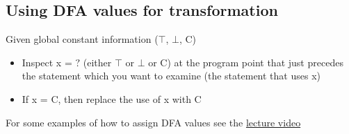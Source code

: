 \subsection{Using DFA values for transformation}

Given global constant information ($\top$, $\bot$, C)
\begin{itemize}
    \item Inspect x = $?$ (either $\top$ or $\bot$ or C) at the program point that just precedes the statement which you want to examine (the statement that uses x)
    \item If x = C, then replace the use of x with C
\end{itemize}

For some examples of how to assign DFA values see the 
\href{https://www.youtube.com/watch?v=EI56VONzCcc&list=PLf3ZkSCyj1tf3rPAkOKY5hUzDrDoekAc7&index=75&ab_channel=compilerai}{lecture video}

